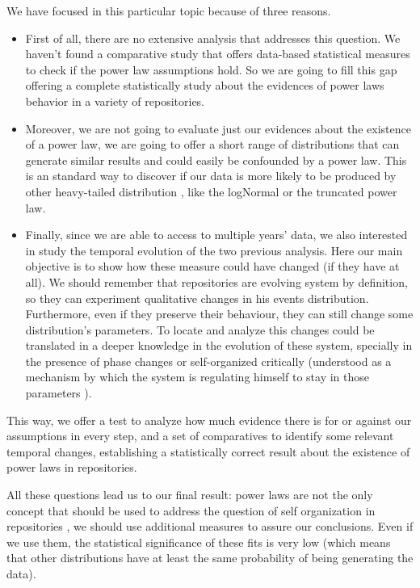 \documentclass{article}
\begin{document}
We have focused in this particular topic because of three
reasons.\begin{itemize}
\item First of all, there are no extensive analysis that addresses
  this question. We haven't found a comparative study that offers
  data-based statistical measures to check if the power law
  assumptions hold.  So we are going to fill this gap offering a
  complete statistically study about the evidences of power laws
  behavior in a variety of repositories.
\item Moreover, we are not going to evaluate just our evidences about
  the existence of a power law, we are going to offer a short range of
  distributions that can generate similar results and could easily be
  confounded by a power law. This is an standard way to discover if
  our data is more likely to be produced by other heavy-tailed
  distribution \cite{clauset2009power}, like the logNormal or the
  truncated power law.
\item Finally, since we are able to access to multiple years' data, we
  also interested in study the temporal evolution of the two previous
  analysis. Here our main objective is to show how these measure could
  have changed (if they have at all). We should remember that
  repositories are evolving system by definition, so they can
  experiment qualitative changes in his events
  distribution. Furthermore, even if they preserve their behaviour,
  they can still change some distribution's parameters.  To locate and
  analyze this changes could be translated in a deeper knowledge in
  the evolution of these system, specially in the presence of phase
  changes \cite{merelo2017self} or self-organized critically
  (understood as a mechanism by which the system is regulating himself
  to stay in those parameters \cite{newman2005power}).
\end{itemize}

This way, we offer a test to analyze how much evidence there is for or
against our assumptions in every step, and a set of comparatives to
identify some relevant temporal changes, establishing a statistically
correct result about the existence of power laws in repositories.

All these questions lead us to our final result: power laws are not the only concept that should be used to address the question of self organization
in repositories \cite{alderson2010contrasting}, we should use additional measures to assure our conclusions. Even if we use
them, the statistical significance of these fits is very low (which
means that other distributions have at least the same probability of being
generating the data).
\end{document}
